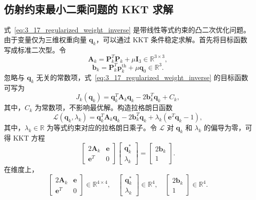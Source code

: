 \subsection{仿射约束最小二乘问题的 KKT 求解}
\label{subsec:3_4_2}

式~\eqref{eq:3_17_regularized_weight_inverse} 是带线性等式约束的凸二次优化问题。由于变量仅为三维权重向量 \(\mathbf{q}_k\)，可以通过 KKT 条件稳定求解。首先将目标函数写成标准二次型。令
\begin{equation}
\mathbf{A}_k
=
\mathbf{P}_k^T\mathbf{P}_k
+
\mu\mathbf{I}_3
\in\mathbb{R}^{3\times3},
\label{eq:3_19_A_matrix}
\end{equation}
\begin{equation}
\mathbf{b}_k
=
\mathbf{P}_k^T\mathbf{p}_k^{\mathrm{th}}
+
\mu\mathbf{q}_0
\in\mathbb{R}^{3}.
\label{eq:3_20_b_vector}
\end{equation}
忽略与 \(\mathbf{q}_k\) 无关的常数项，式~\eqref{eq:3_17_regularized_weight_inverse} 的目标函数可写为
\begin{equation}
J_k(\mathbf{q}_k)
=
\mathbf{q}_k^T\mathbf{A}_k\mathbf{q}_k
-
2\mathbf{b}_k^T\mathbf{q}_k
+ C_k,
\label{eq:3_21_quadratic_objective}
\end{equation}
其中，\(C_k\) 为常数项，不影响最优解。构造拉格朗日函数
\begin{equation}
\mathcal{L}(\mathbf{q}_k,\lambda_k)
=
\mathbf{q}_k^T\mathbf{A}_k\mathbf{q}_k
-
2\mathbf{b}_k^T\mathbf{q}_k
+
\lambda_k
\left(
\mathbf{e}^T\mathbf{q}_k-1
\right),
\label{eq:3_22_lagrangian}
\end{equation}
其中，\(\lambda_k\in\mathbb{R}\) 为等式约束对应的拉格朗日乘子。令 \(\mathcal{L}\) 对 \(\mathbf{q}_k\) 和 \(\lambda_k\) 的偏导为零，可得 KKT 方程
\begin{equation}
\begin{bmatrix}
2\mathbf{A}_k & \mathbf{e}\\
\mathbf{e}^T & 0
\end{bmatrix}
\begin{bmatrix}
\mathbf{q}_k^\ast\\
\lambda_k
\end{bmatrix}
=
\begin{bmatrix}
2\mathbf{b}_k\\
1
\end{bmatrix}.
\label{eq:3_23_kkt_system}
\end{equation}
在维度上，
\begin{equation}
\begin{bmatrix}
2\mathbf{A}_k & \mathbf{e}\\
\mathbf{e}^T & 0
\end{bmatrix}
\in\mathbb{R}^{4\times4},
\quad
\begin{bmatrix}
\mathbf{q}_k^\ast\\
\lambda_k
\end{bmatrix}
\in\mathbb{R}^{4},
\quad
\begin{bmatrix}
2\mathbf{b}_k\\
1
\end{bmatrix}
\in\mathbb{R}^{4}.
\label{eq:3_24_kkt_dimension}
\end{equation}
